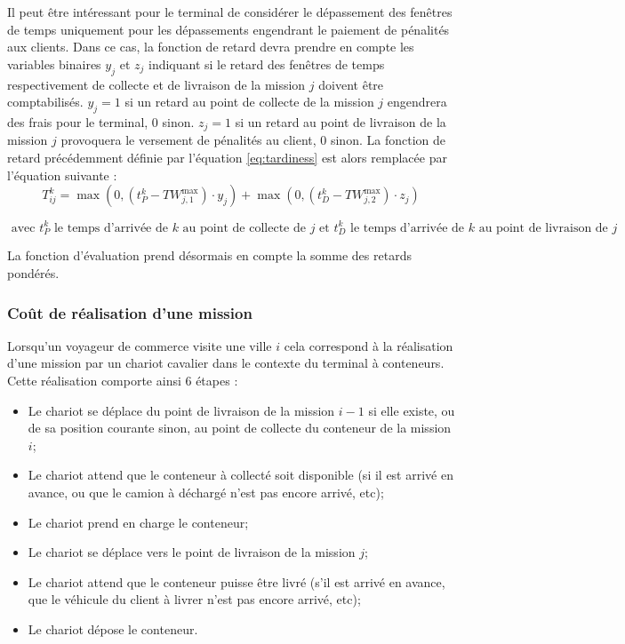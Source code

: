 Il peut être intéressant pour le terminal de considérer le dépassement des fenêtres de temps uniquement pour les dépassements engendrant le paiement de pénalités aux clients. Dans ce cas, la fonction de retard devra prendre en compte les variables binaires $y_{j}$ et $z_{j}$ indiquant si le retard des fenêtres de temps respectivement de collecte et de livraison de la mission $j$ doivent être comptabilisés. $y_j = 1$ si un retard au point de collecte de la mission $j$ engendrera des frais pour le terminal, 0 sinon. $z_j=1$ si un retard au point de livraison de la mission $j$ provoquera le versement de pénalités au client, 0 sinon. La fonction de retard précédemment définie par l'équation \ref{eq:tardiness} est alors remplacée par l'équation suivante : 
\begin{equation}
 \label{eq:tardiness2}
    T^k_{ij} = \max \left( 0 , (t^k_P - TW_{j,1}^{\max})\cdot y_{j} \right) +  \max \left( 0 , (t^k_D - TW_{j,2}^{\max})\cdot z_{j} \right)
\end{equation}
\begin{center}
  $\scriptstyle \text{ avec } t^k_P \text{ le temps d'arrivée de $k$ au point de collecte de } j \text{ et } t^k_D \text{ le temps d'arrivée de $k$ au point de livraison de } j$
\end{center}

La fonction d'évaluation prend désormais en compte la somme des retards pondérés.

\subsubsection{Coût de réalisation d'une mission}

Lorsqu'un voyageur de commerce visite une ville $i$ cela correspond à la réalisation d'une mission par un chariot cavalier dans le contexte du terminal à conteneurs. Cette réalisation comporte ainsi 6 étapes : 
\begin{itemize}
 \item Le chariot se déplace du point de livraison de la mission $i-1$ si elle existe, ou de sa position courante sinon, au point de collecte du conteneur de la mission $i$;
 \item Le chariot attend que le conteneur à collecté soit disponible (si il est arrivé en avance, ou que le camion à déchargé n'est pas encore arrivé, etc);
 \item Le chariot prend en charge le conteneur;
 \item Le chariot se déplace vers le point de livraison de la mission $j$;
 \item Le chariot attend que le conteneur puisse être livré (s'il est arrivé en avance, que le véhicule du client à livrer n'est pas encore arrivé, etc);
 \item Le chariot dépose le conteneur.
\end{itemize}

